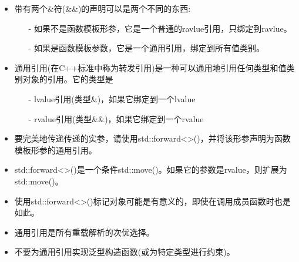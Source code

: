 \begin{itemize}
	\item 带有两个\&符(\&\&)的声明可以是两个不同的东西:
	\begin{itemize}
		\item[-] 如果不是函数模板形参，它是一个普通的ravlue引用，只绑定到ravlue。
		\item[-] 如果是函数模板参数，它是一个通用引用，绑定到所有值类别。
	\end{itemize}
	\item 通用引用(在C++标准中称为转发引用)是一种可以通用地引用任何类型和值类别对象的引用。它的类型是
		\begin{itemize}
		\item[-] lvalue引用(类型\&)，如果它绑定到一个lvalue
		\item[-] rvalue引用(类型\&\&)，如果它绑定到一个rvalue
	\end{itemize}
	\item 要完美地传递传递的实参，请使用std::forward<>()，并将该形参声明为函数模板形参的通用引用。
	\item std::forward<>()是一个条件std::move()。如果它的参数是rvalue，则扩展为std::move()。
	\item 使用std::forward<>()标记对象可能是有意义的，即使在调用成员函数时也是如此。
	\item 通用引用是所有重载解析的次优选择。
	\item 不要为通用引用实现泛型构造函数(或为特定类型进行约束)。
\end{itemize}


\newpage